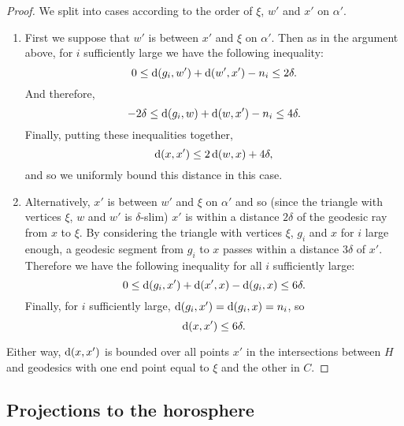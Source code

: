 \documentclass[a4paper]{article}
\begin{document}
\begin{proof}
  We split into cases according to the order of $\xi$, $w'$ and $x'$ on
  $\alpha'$.
  \begin{enumerate}
    \item
      First we suppose that $w'$ is between $x'$ and $\xi$ on $\alpha'$. Then as
      in the argument above, for $i$ sufficiently large we have the following
      inequality:
      \begin{equation*}
        0 \leq \operatorname{d}(g_i, w') + \operatorname{d}(w', x') - n_i \leq 2\delta.
      \end{equation*}
      And therefore,
      \begin{equation*}
        -2\delta \leq \operatorname{d}(g_i, w) + \operatorname{d}(w, x') - n_i \leq 4\delta.
      \end{equation*}
      Finally, putting these inequalities together,
      \begin{equation*}
        \operatorname{d}(x, x') \leq 2\operatorname{d}(w, x) + 4\delta,
      \end{equation*}
      and so we uniformly bound this distance in this case.
    \item
      Alternatively, $x'$ is between $w'$ and $\xi$ on $\alpha'$ and so (since
      the triangle with vertices $\xi$, $w$ and $w'$ is $\delta$-slim) $x'$ is
      within a distance $2\delta$ of the geodesic ray from $x$ to $\xi$. By
      considering the triangle with vertices $\xi$, $g_i$ and $x$ for $i$ large
      enough, a geodesic segment from $g_i$ to $x$ passes within a distance
      $3\delta$ of $x'$. Therefore we have the following inequality for all $i$
      sufficiently large:
      \begin{equation*}
        0 \leq \operatorname{d}(g_i, x') + \operatorname{d}(x', x) - \operatorname{d}(g_i, x) \leq 6\delta.
      \end{equation*}
      Finally, for $i$ sufficiently large, $\operatorname{d}(g_i, x') = \operatorname{d}(g_i, x) = n_i$,
      so
      \begin{equation*}
        \operatorname{d}(x,x') \leq 6\delta.\qedhere
      \end{equation*}
  \end{enumerate}
  Either way, $\operatorname{d}(x, x')$ is bounded over all points $x'$ in the
  intersections between $H$ and geodesics with one end point equal to $\xi$ and
  the other in $C$.
\end{proof}

\subsection{Projections to the horosphere}
\end{document}

